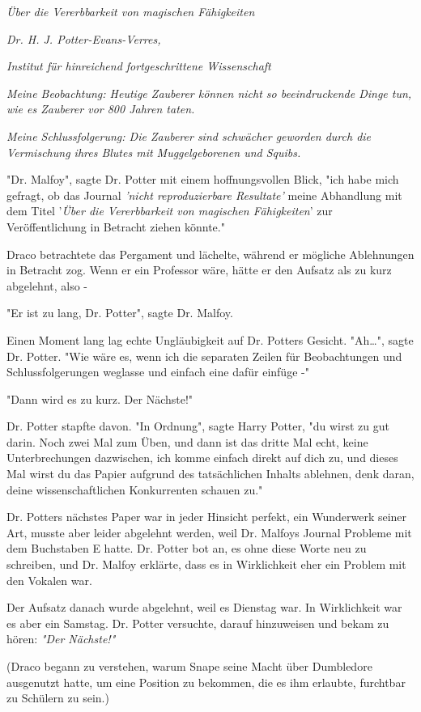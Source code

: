 {\emph{Über die Vererbbarkeit von magischen Fähigkeiten}

\emph{Dr. H. J. Potter-Evans-Verres,}

\emph{Institut für hinreichend fortgeschrittene Wissenschaft}

\emph{Meine Beobachtung: Heutige Zauberer können nicht so beeindruckende Dinge tun, wie es Zauberer vor 800 Jahren taten.}

\emph{Meine Schlussfolgerung: Die Zauberer sind schwächer geworden durch die Vermischung ihres Blutes mit Muggelgeborenen und Squibs.}

"Dr. Malfoy", sagte Dr. Potter mit einem hoffnungsvollen Blick, "ich habe mich gefragt, ob das Journal \emph{'nicht reproduzierbare Resultate'} meine Abhandlung mit dem Titel '\emph{Über die Vererbbarkeit von magischen Fähigkeiten}' zur Veröffentlichung in Betracht ziehen könnte."

Draco betrachtete das Pergament und lächelte, während er mögliche Ablehnungen in Betracht zog. Wenn er ein Professor wäre, hätte er den Aufsatz als zu kurz abgelehnt, also -

"Er ist zu lang, Dr. Potter", sagte Dr. Malfoy.

Einen Moment lang lag echte Ungläubigkeit auf Dr. Potters Gesicht. "Ah…", sagte Dr. Potter. "Wie wäre es, wenn ich die separaten Zeilen für Beobachtungen und Schlussfolgerungen weglasse und einfach eine dafür einfüge -"

"Dann wird es zu kurz. Der Nächste!"

Dr. Potter stapfte davon. "In Ordnung", sagte Harry Potter, "du wirst zu gut darin. Noch zwei Mal zum Üben, und dann ist das dritte Mal echt, keine Unterbrechungen dazwischen, ich komme einfach direkt auf dich zu, und dieses Mal wirst du das Papier aufgrund des tatsächlichen Inhalts ablehnen, denk daran, deine wissenschaftlichen Konkurrenten schauen zu."

Dr. Potters nächstes Paper war in jeder Hinsicht perfekt, ein Wunderwerk seiner Art, musste aber leider abgelehnt werden, weil Dr. Malfoys Journal Probleme mit dem Buchstaben E hatte. Dr. Potter bot an, es ohne diese Worte neu zu schreiben, und Dr. Malfoy erklärte, dass es in Wirklichkeit eher ein Problem mit den Vokalen war.

Der Aufsatz danach wurde abgelehnt, weil es Dienstag war. In Wirklichkeit war es aber ein Samstag. Dr. Potter versuchte, darauf hinzuweisen und bekam zu hören: \emph{"Der Nächste!"}

(Draco begann zu verstehen, warum Snape seine Macht über Dumbledore ausgenutzt hatte, um eine Position zu bekommen, die es ihm erlaubte, furchtbar zu Schülern zu sein.)

}
